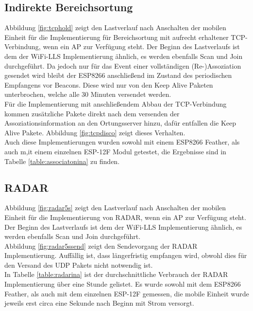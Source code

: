 \subsection{Indirekte Bereichsortung}
\label{ch:realworld:sec:indirekt}
Abbildung \ref{fig:tcphold} zeigt den Lastverlauf nach Anschalten der mobilen Einheit für die Implementierung für Bereichsortung mit aufrecht erhaltener TCP-Verbindung, wenn ein AP zur Verfügung steht. 
Der Beginn des Lastverlaufs ist dem der WiFi-LLS Implementierung ähnlich, es werden ebenfalls Scan und Join durchgeführt.
Da jedoch nur für das Event einer vollständigen (Re-)Assoziation gesendet wird bleibt der ESP8266 anschließend im Zustand des periodischen Empfangens vor Beacons.
Diese wird nur von den Keep Alive Paketen unterbrochen, welche alle 30 Minuten versendet werden.\\
Für die Implementierung mit anschließendem Abbau der TCP-Verbindung kommen zusätzliche Pakete direkt nach dem versenden der Assoziationsinformation an den Ortungsserver hinzu, dafür entfallen die Keep Alive Pakete.
Abbildung \ref{fig:tcpdisco} zeigt dieses Verhalten.\\
Auch diese Implementierungen wurden sowohl mit einem ESP8266 Feather, als auch m,it einem einzelnen ESP-12F Modul getestet, die Ergebnisse sind in Tabelle \ref{table:associatonina} zu finden.

\subsection{RADAR}
Abbildung \ref{fig:radar5s} zeigt den Lastverlauf nach Anschalten der mobilen Einheit für die Implementierung von RADAR, wenn ein AP zur Verfügung steht. 
Der Beginn des Lastverlaufs ist dem der WiFi-LLS Implementierung ähnlich, es werden ebenfalls Scan und Join durchgeführt.\\
Abbildung \ref{fig:radar5ssend} zeigt den Sendevorgang der RADAR Implementierung.
Auffällig ist, dass längerfristig empfangen wird, obwohl dies für den Versand des UDP Pakets nicht notwendig ist.\\
In Tabelle \ref{table:radarina} ist der durchschnittliche Verbrauch der RADAR Implementierung über eine Stunde gelistet.
Es wurde sowohl mit dem ESP8266 Feather, als auch mit dem einzelnen ESP-12F gemessen, die mobile Einheit wurde jeweils erst circa eine Sekunde nach Beginn mit Strom versorgt.

